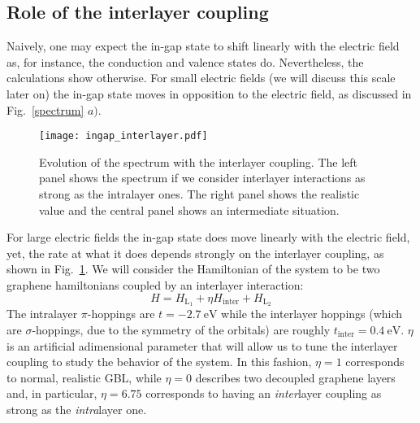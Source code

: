 \documentclass[a4paper]{article}
\begin{document}
\subsection{Role of the interlayer coupling}
Naively, one may expect the in-gap state to shift linearly with the electric field as, for instance, the conduction and valence states do. Nevertheless, the calculations show otherwise.
For small electric fields (we will discuss this scale later on) the in-gap state moves in opposition to the electric field, as discussed in Fig.~\ref{spectrum} $a)$.
\begin{figure}[!ht!]
\centering
\texttt{[image: ingap\_interlayer.pdf]}
\vspace{-15pt}
\caption{Evolution of the spectrum with the interlayer coupling. The left panel shows the spectrum if we consider interlayer interactions as strong as the intralayer ones. The right panel shows the realistic value and the central panel shows an intermediate situation.}
\label{ingap_interlayer}
\end{figure}
For large electric fields the in-gap state does move linearly with the electric field, yet, the rate at what it does depends strongly on the interlayer coupling, as shown in Fig.~\ref{ingap_interlayer}.
We will consider the Hamiltonian of the system to be two graphene hamiltonians coupled by an interlayer interaction:
\begin{equation}
  H = H_{\text{L}_1} + \eta H_{\text{inter}} + H_{\text{L}_2}
\end{equation}
The intralayer $\pi$-hoppings are $t=\SI{-2.7}{\eV}$ while the interlayer hoppings (which are $\sigma$-hoppings, due to the symmetry of the orbitals) are roughly $t_{\text{inter}}=\SI{0.4}{\eV}$. $\eta$ is an artificial adimensional parameter that will allow us to tune the interlayer coupling to study the behavior of the system. In this fashion, $\eta=1$ corresponds to normal, realistic GBL, while $\eta=0$ describes two decoupled graphene layers and, in particular, $\eta=6.75$ corresponds to having an \emph{inter}layer coupling as strong as the \emph{intra}layer one.\\
\end{document}
